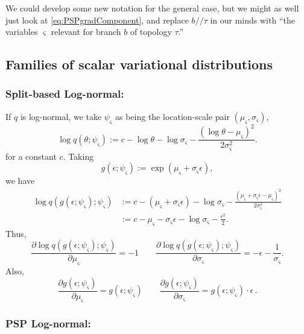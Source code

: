 \documentclass{article}
\newcommand{\psp}{\slash\!\!\slash}
\begin{document}
We could develop some new notation for the general case, but we might as well just look at \eqref{eq:PSPgradComponent}, and replace $b \psp \tau$ in our minds with ``the variables $\varsigma$ relevant for branch $b$ of topology $\tau$.''


\subsection*{Families of scalar variational distributions}
\subsubsection*{Split-based Log-normal:}
If $q$ is log-normal, we take $\psi_\varsigma$ as being the location-scale pair $(\mu_\varsigma, \sigma_\varsigma)$,
\[
\log q(\theta; \psi_\varsigma) := c - \log \theta - \log \sigma_\varsigma - \frac{(\log \theta - \mu_\varsigma)^2}{2 \sigma_\varsigma^2}.
\]
for a constant $c$.
Taking
\begin{equation}
g(\epsilon; \psi_\varsigma) := \exp(\mu_\varsigma + \sigma_\varsigma \epsilon),
\label{eq:gLogNorm}
\end{equation}
we have
\begin{align*}
\log q(g(\epsilon; \psi_\varsigma); \psi_\varsigma)
& := c - (\mu_\varsigma + \sigma_\varsigma \epsilon)
    - \log \sigma_\varsigma
    - \frac{(\mu_\varsigma + \sigma_\varsigma \epsilon - \mu_\varsigma)^2}{2 \sigma_\varsigma^2} \\
& := c - \mu_\varsigma - \sigma_\varsigma \epsilon - \log \sigma_\varsigma - \frac{\epsilon^2}{2}.
\end{align*}
Thus,
\begin{equation}
    \frac{\partial \log q(g(\epsilon; \psi_\varsigma); \psi_\varsigma)}{\partial \mu_\varsigma} = -1
    \qquad
    \frac{\partial \log q(g(\epsilon; \psi_\varsigma); \psi_\varsigma)}{\partial \sigma_\varsigma} = -\epsilon - \frac{1}{\sigma_\varsigma}.
    \label{eq:dlogqgdPsi}
\end{equation}
Also,
\begin{equation}
    \frac{\partial g(\epsilon; \psi_\varsigma)}{\partial \mu_\varsigma} = g(\epsilon; \psi_\varsigma)
    \qquad
    \frac{\partial g(\epsilon; \psi_\varsigma)}{\partial \sigma_\varsigma} = g(\epsilon; \psi_\varsigma) \cdot \epsilon \, .
    \label{eq:dgdPsi}
\end{equation}


\subsubsection*{PSP Log-normal:}
\end{document}
